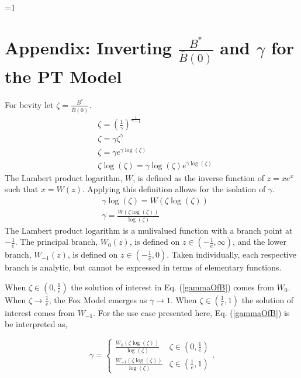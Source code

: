 \documentclass[12pt]{article}
\newcounter{alphasect}
\def\alphainsection{0}
\let\oldsection=\section
\def\section{%
  \ifnum\alphainsection=1%
    \addtocounter{alphasect}{1}
  \fi%
\oldsection}%
\begin{document}
\section{Appendix\label{lambApp}: Inverting $\frac{B^*}{\bar B(0)}$ and $\gamma$ for the PT Model}
For bevity let $\zeta=\frac{B^*}{\bar B(0)}$.
\begin{align*}
&\zeta=\left(\frac{1}{\gamma}\right)^{\frac{1}{\gamma-1}}\\
&\zeta=\gamma\zeta^{\gamma}\\
&\zeta=\gamma e^{\gamma\log(\zeta)}\\
&\zeta\log(\zeta)=\gamma\log(\zeta) e^{\gamma\log(\zeta)}
\end{align*}
The Lambert product logarithm, $W$, is defined as the inverse function of $z=xe^x$ such that $x=W(z)$. 
Applying this definition allows for the isolation of $\gamma$.
\begin{align}
&\gamma\log(\zeta)=W\left(\zeta\log(\zeta)\right) \nonumber\\
&\gamma=\frac{W\left(\zeta\log(\zeta)\right)}{\log(\zeta)} \label{gammaOfZeta}
\end{align}
The Lambert product logarithm is a mulivalued function with a branch point at 
$-\frac{1}{e}$. The principal branch, $W_0(z)$, is defined on $z\in\left(-\frac{1}{e}, \infty\right)$, 
and the lower branch, $W_{-1}(z)$, is defined on $z\in\left(-\frac{1}{e}, 0\right)$. Taken 
individually, each respective branch is analytic, but cannot be expressed in terms 
of elementary functions.

%
When $\zeta\in\left(0, \frac{1}{e}\right)$ the solution of interest in Eq. (\ref{gammaOfB}) 
comes from $W_0$. %
When $\zeta\to\frac{1}{e}$, the Fox Model emerges as $\gamma\to1$.
When $\zeta\in\left(\frac{1}{e}, 1\right)$ the solution of interest comes from 
$W_{-1}$. For the use case presented here, Eq. (\ref{gammaOfB}) is be interpreted as,

\begin{equation}
\gamma = 
\begin{cases} 
\frac{W_0\left(\zeta\log\left(\zeta\right)\right)}{\log\left(\zeta\right)} & \zeta\in\left(0, \frac{1}{e}\right)\\
\frac{W_{-1}\left(\zeta\log\left(\zeta\right)\right)}{\log\left(\zeta\right)} & \zeta\in\left(\frac{1}{e}, 1\right)
\end{cases}. 
\end{equation} 
\end{document}
